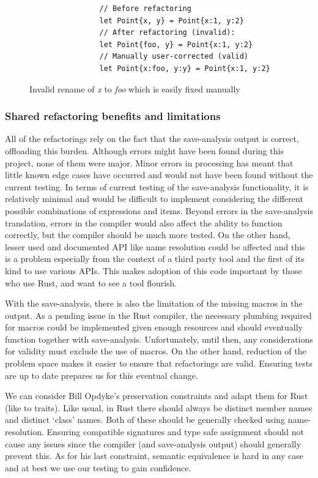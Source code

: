 \begin{figure}
\begin{verbatim}
                // Before refactoring
                let Point{x, y} = Point{x:1, y:2}
                // After refactoring (invalid):
                let Point{foo, y} = Point{x:1, y:2}
                // Manually user-corrected (valid)
                let Point{x:foo, y:y} = Point{x:1, y:2}
\end{verbatim}
\caption{Invalid rename of \emph{x} to \emph{foo} which is easily fixed manually}
\label{Fig:fix}
\end{figure}

\subsubsection{Shared refactoring benefits and limitations}
All of the refactorings rely on the fact that the save-analysis output is correct, offloading this burden. Although errors might have been found during this project, none of them were major. Minor errors in processing has meant that little known edge cases have occurred and would not have been found without the current testing. In terms of current testing of the save-analysis functionality, it is relatively minimal and would be difficult to implement considering the different possible combinations of expressions and items. Beyond errors in the save-analysis translation, errors in the compiler would also affect the ability to function correctly, but the compiler should be much more tested. On the other hand, lesser used and documented API like name resolution could be affected and this is a problem especially from the context of a third party tool and the first of its kind to use various APIs. This makes adoption of this code important by those who use Rust, and want to see a tool flourish.

With the save-analysis, there is also the limitation of the missing macros in the output. As a pending issue in the Rust compiler, the necessary plumbing required for macros could be implemented given enough resources and should eventually function together with save-analysis. Unfortunately, until then, any considerations for validity must exclude the use of macros. On the other hand, reduction of the problem space makes it easier to ensure that refactorings are valid. Ensuring tests are up to date prepares us for this eventual change.

We can consider Bill Opdyke's preservation constraints and adapt them for Rust (like to traits). Like usual, in Rust there should always be distinct member names and distinct `class' names. Both of these should be generally checked using name-resolution. Ensuring compatible signatures and type safe assignment should not cause any issues since the compiler (and save-analysis output) should generally prevent this. As for his last constraint, semantic equivalence is hard in any case and at best we use our testing to gain confidence.

